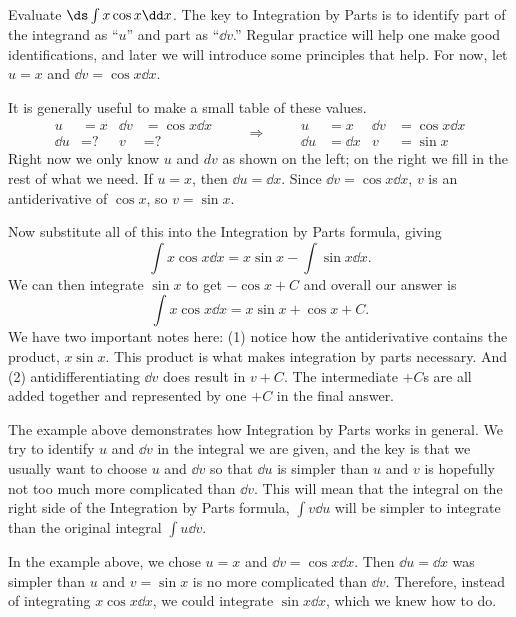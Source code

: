\begin{example}\label{ex_ibp1}
Evaluate $\ds\int x\cos{x}\dd x$.
\solution
The key to Integration by Parts is to identify part of the integrand as ``$u$'' and part as ``$\dd v$.'' Regular practice will help one make good identifications, and later we will introduce some principles that help. For now, let  $u=x$ and $\dd v=\cos x\dd x$.

It is generally useful to make a small table of these values.
\[
\begin{aligned}
u&= x & \dd v&=\cos x\dd x\\
\dd u&= \text{?} & v&=\text{?}
\end{aligned}
\qquad\Rightarrow\qquad
\begin{aligned}
u&= x & \dd v&=\cos x\dd x\\
\dd u&= \dd x & v&=\sin x
\end{aligned}
\]
Right now we only know $u$ and $dv$ as shown on the left; on the right we fill in the rest of what we need. If $u = x$, then $\dd u = \dd x$. Since $\dd v = \cos x\dd x$, $v$ is an antiderivative of $\cos x$, so $v = \sin x$.

Now substitute all of this into the Integration by Parts formula, giving
\[\int x\cos x\dd x = x\sin x - \int \sin x\dd x.\]
We can then integrate $\sin x$ to get $-\cos x + C$ and overall our answer is
\[\int x\cos x\dd x = x\sin x + \cos x + C.\]
We have two important notes here: (1) notice how the antiderivative contains the product, $x\sin x$. This product is what makes integration by parts necessary. And (2) antidifferentiating $\dd v$ does result in $v+C$. The intermediate $+C$s are all added together and represented by one $+C$ in the final answer.
\end{example}

The example above demonstrates how Integration by Parts works in general.  We try to identify $u$ and $\dd v$ in the integral we are given, and the key is that we usually want to choose $u$ and $\dd v$ so that $\dd u$ is simpler than $u$ and $v$ is hopefully not too much more complicated than $\dd v$.  This will mean that the integral on the right side of the Integration by Parts formula, $\int v\dd u$ will be simpler to integrate than the original integral $\int u\dd v$.

In the example above, we chose $u=x$ and $\dd v=\cos x\dd x$.  Then $\dd u=\dd x$ was simpler than $u$ and $v=\sin x$ is no more complicated than $\dd v$.  Therefore, instead of integrating $x\cos x\dd x$, we could integrate $\sin x\dd x$, which we knew how to do.

